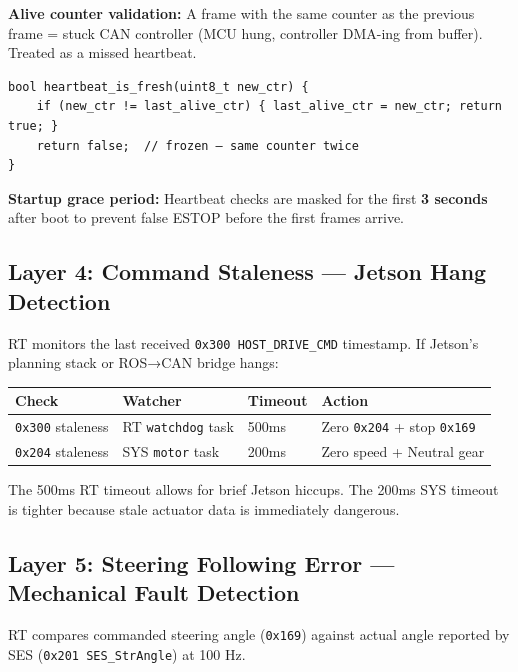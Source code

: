 \documentclass[12pt,a4paper,oneside]{report}
\begin{document}
\textbf{Alive counter validation:} A frame with the same counter as the previous
frame = stuck CAN controller (MCU hung, controller DMA-ing from buffer). Treated
as a missed heartbeat.

\begin{verbatim}
bool heartbeat_is_fresh(uint8_t new_ctr) {
    if (new_ctr != last_alive_ctr) { last_alive_ctr = new_ctr; return true; }
    return false;  // frozen — same counter twice
}
\end{verbatim}

\textbf{Startup grace period:} Heartbeat checks are masked for the first
\textbf{3 seconds} after boot to prevent false ESTOP before the first frames
arrive.

\subsection{Layer 4: Command Staleness --- Jetson Hang
Detection}\label{layer-4-command-staleness-jetson-hang-detection}

RT monitors the last received \texttt{0x300\ HOST\_DRIVE\_CMD} timestamp. If
Jetson's planning stack or ROS→CAN bridge hangs:

\begin{longtable}[]{@{}llll@{}}
\toprule\noalign{}
Check & Watcher & Timeout & Action \\
\midrule\noalign{}
\endhead
\bottomrule\noalign{}
\endlastfoot
\texttt{0x300} staleness & RT \texttt{watchdog} task & 500ms & Zero
\texttt{0x204} + stop \texttt{0x169} \\
\texttt{0x204} staleness & SYS \texttt{motor} task & 200ms & Zero speed +
Neutral gear \\
\end{longtable}

The 500ms RT timeout allows for brief Jetson hiccups. The 200ms SYS timeout is
tighter because stale actuator data is immediately dangerous.

\subsection{Layer 5: Steering Following Error --- Mechanical Fault
Detection}\label{layer-5-steering-following-error-mechanical-fault-detection}

RT compares commanded steering angle (\texttt{0x169}) against actual angle
reported by SES (\texttt{0x201\ SES\_StrAngle}) at 100 Hz.
\end{document}
